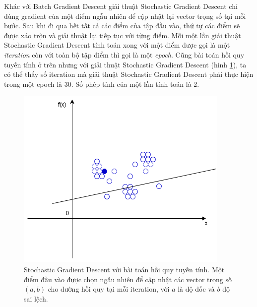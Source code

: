\begin{enumerate}
Khác với Batch Gradient Descent giải thuật Stochastic Gradient Descent chỉ dùng gradient của một điểm ngẫu nhiên để cập nhật lại vector trọng số tại mỗi bước. Sau khi đi qua hết tất cả các điểm của tập đầu vào, thứ tự các điểm sẽ được xáo trộn và giải thuật lại tiếp tục với từng điểm. Mỗi một lần giải thuật Stochastic Gradient Descent tính toán xong với một điểm được gọi là một \emph{iteration} còn với toàn bộ tập điểm thì gọi là một \emph{epoch}. Cũng bài toán hồi quy tuyến tính ở trên nhưng với giải thuật Stochastic Gradient Descent (hình \ref{fig:stochastic_gradient_descent}), ta có thể thấy số iteration mà giải thuật Stochastic Gradient Descent phải thực hiện trong một epoch là 30. Số phép tính của một lần tính toán là 2. 
\begin{figure}[ht!]
	\centerline{\includegraphics[scale=0.6]{images/stochastic_gradient_descent.png}}
  	\caption{Stochastic Gradient Descent với bài toán hồi quy tuyến tính. Một điểm đầu vào được chọn ngẫu nhiên để cập nhật các vector trọng số $(a,b)$ cho đường hồi quy tại mỗi iteration, với $a$ là độ dốc và $b$ độ sai lệch.}
  	\label{fig:stochastic_gradient_descent}
\end{figure}


\end{enumerate}
